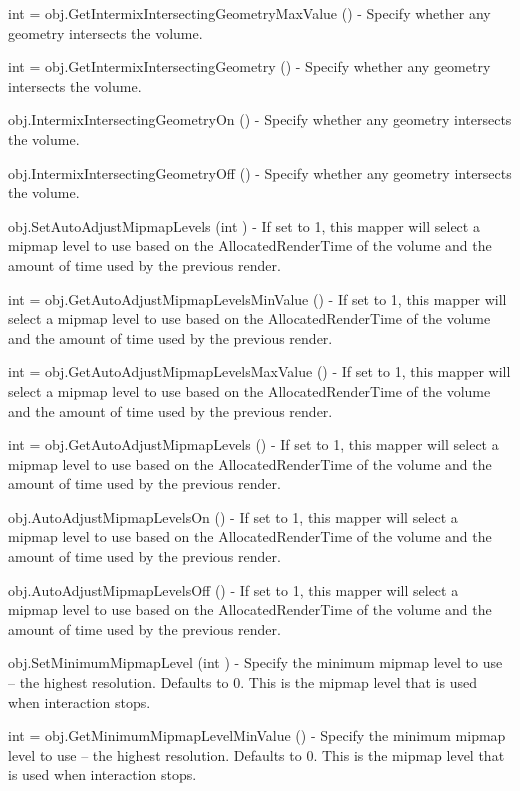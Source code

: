 \begin{DoxyItemize}
\item {\ttfamily int = obj.\-Get\-Intermix\-Intersecting\-Geometry\-Max\-Value ()} -\/ Specify whether any geometry intersects the volume.  
\item {\ttfamily int = obj.\-Get\-Intermix\-Intersecting\-Geometry ()} -\/ Specify whether any geometry intersects the volume.  
\item {\ttfamily obj.\-Intermix\-Intersecting\-Geometry\-On ()} -\/ Specify whether any geometry intersects the volume.  
\item {\ttfamily obj.\-Intermix\-Intersecting\-Geometry\-Off ()} -\/ Specify whether any geometry intersects the volume.  
\item {\ttfamily obj.\-Set\-Auto\-Adjust\-Mipmap\-Levels (int )} -\/ If set to 1, this mapper will select a mipmap level to use based on the Allocated\-Render\-Time of the volume and the amount of time used by the previous render.  
\item {\ttfamily int = obj.\-Get\-Auto\-Adjust\-Mipmap\-Levels\-Min\-Value ()} -\/ If set to 1, this mapper will select a mipmap level to use based on the Allocated\-Render\-Time of the volume and the amount of time used by the previous render.  
\item {\ttfamily int = obj.\-Get\-Auto\-Adjust\-Mipmap\-Levels\-Max\-Value ()} -\/ If set to 1, this mapper will select a mipmap level to use based on the Allocated\-Render\-Time of the volume and the amount of time used by the previous render.  
\item {\ttfamily int = obj.\-Get\-Auto\-Adjust\-Mipmap\-Levels ()} -\/ If set to 1, this mapper will select a mipmap level to use based on the Allocated\-Render\-Time of the volume and the amount of time used by the previous render.  
\item {\ttfamily obj.\-Auto\-Adjust\-Mipmap\-Levels\-On ()} -\/ If set to 1, this mapper will select a mipmap level to use based on the Allocated\-Render\-Time of the volume and the amount of time used by the previous render.  
\item {\ttfamily obj.\-Auto\-Adjust\-Mipmap\-Levels\-Off ()} -\/ If set to 1, this mapper will select a mipmap level to use based on the Allocated\-Render\-Time of the volume and the amount of time used by the previous render.  
\item {\ttfamily obj.\-Set\-Minimum\-Mipmap\-Level (int )} -\/ Specify the minimum mipmap level to use -- the highest resolution. Defaults to 0. This is the mipmap level that is used when interaction stops.  
\item {\ttfamily int = obj.\-Get\-Minimum\-Mipmap\-Level\-Min\-Value ()} -\/ Specify the minimum mipmap level to use -- the highest resolution. Defaults to 0. This is the mipmap level that is used when interaction stops.  

\end{DoxyItemize}
